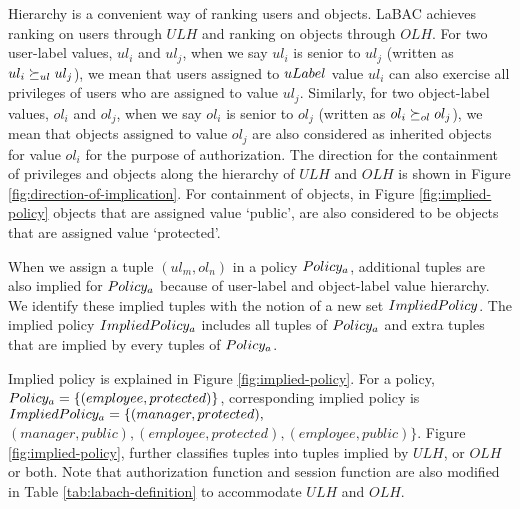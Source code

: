 	Hierarchy is a convenient way of ranking users and objects. LaBAC achieves ranking on users through $ULH$ and ranking on objects through $OLH$. For two user-label values, $ul_i$ and $ul_j$, when we say $ul_i$ is senior to $ul_j$ (written as $ul_i \succeq_{ul} ul_j$), we mean that users assigned to $uLabel$ value $ul_i$  can also exercise all privileges of users who are assigned to value $ul_j$. Similarly, for two object-label values, $ol_i$ and $ol_j$, when we say $ol_i$ is senior to $ol_j$ (written as $ol_i \succeq_{ol} ol_j$), we mean that objects assigned to value $ol_j$ are also considered as inherited objects for value $ol_i$ for the purpose of authorization. The direction for the containment of privileges and objects along the hierarchy of $ULH$ and $OLH$ is shown in Figure \ref{fig:direction-of-implication}. For containment of objects, in Figure \ref{fig:implied-policy} objects that are assigned value `public', are also considered to be objects that are assigned  value `protected'.
	
	
	When we assign a tuple $(ul_m,ol_n)$ in a policy $Policy_a$, additional tuples are also implied for $Policy_a$ because of user-label and object-label value hierarchy. We identify these implied tuples with the notion of a new set $ImpliedPolicy$. The implied policy  $ImpliedPolicy_a$ includes all tuples of $Policy_a$ and extra tuples that are implied by every tuples of $Policy_a$. 
	
	

	
		
		

	
	
	Implied policy is  explained in Figure \ref{fig:implied-policy}.  For a policy, $Policy_a = \{(employee, protected)\}$, corresponding implied policy is $ImpliedPolicy_a=\{(manager, protected),$ \\$ (manager, public), (employee, protected), (employee, public)\}$. Figure \ref{fig:implied-policy}, further classifies tuples into tuples implied by $ULH$, or $OLH$ or both. Note that authorization function and session function are also modified in Table \ref{tab:labach-definition} to accommodate $ULH$ and $OLH$.
	


